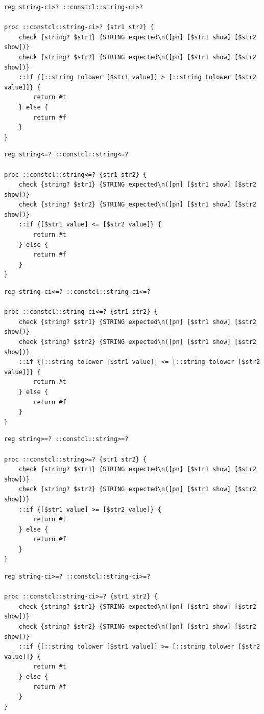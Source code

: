 \documentclass[twoside,9pt]{report}
\begin{document}
\noindent\makebox[\linewidth]{\rule{\linewidth}{0.4pt}}
\noindent\makebox[\linewidth]{\rule{\linewidth}{0.4pt}}
\begin{lstlisting}
reg string-ci>? ::constcl::string-ci>?
 
proc ::constcl::string-ci>? {str1 str2} {
    check {string? $str1} {STRING expected\n([pn] [$str1 show] [$str2 show])}
    check {string? $str2} {STRING expected\n([pn] [$str1 show] [$str2 show])}
    ::if {[::string tolower [$str1 value]] > [::string tolower [$str2 value]]} {
        return #t
    } else {
        return #f
    }
}
\end{lstlisting}
\noindent\makebox[\linewidth]{\rule{\linewidth}{0.4pt}}
\noindent\makebox[\linewidth]{\rule{\linewidth}{0.4pt}}
\begin{lstlisting}
reg string<=? ::constcl::string<=?
 
proc ::constcl::string<=? {str1 str2} {
    check {string? $str1} {STRING expected\n([pn] [$str1 show] [$str2 show])}
    check {string? $str2} {STRING expected\n([pn] [$str1 show] [$str2 show])}
    ::if {[$str1 value] <= [$str2 value]} {
        return #t
    } else {
        return #f
    }
}
\end{lstlisting}
\noindent\makebox[\linewidth]{\rule{\linewidth}{0.4pt}}
\noindent\makebox[\linewidth]{\rule{\linewidth}{0.4pt}}
\begin{lstlisting}
reg string-ci<=? ::constcl::string-ci<=?
 
proc ::constcl::string-ci<=? {str1 str2} {
    check {string? $str1} {STRING expected\n([pn] [$str1 show] [$str2 show])}
    check {string? $str2} {STRING expected\n([pn] [$str1 show] [$str2 show])}
    ::if {[::string tolower [$str1 value]] <= [::string tolower [$str2 value]]} {
        return #t
    } else {
        return #f
    }
}
\end{lstlisting}
\noindent\makebox[\linewidth]{\rule{\linewidth}{0.4pt}}
\noindent\makebox[\linewidth]{\rule{\linewidth}{0.4pt}}
\begin{lstlisting}
reg string>=? ::constcl::string>=?
 
proc ::constcl::string>=? {str1 str2} {
    check {string? $str1} {STRING expected\n([pn] [$str1 show] [$str2 show])}
    check {string? $str2} {STRING expected\n([pn] [$str1 show] [$str2 show])}
    ::if {[$str1 value] >= [$str2 value]} {
        return #t
    } else {
        return #f
    }
}
\end{lstlisting}
\noindent\makebox[\linewidth]{\rule{\linewidth}{0.4pt}}
\noindent\makebox[\linewidth]{\rule{\linewidth}{0.4pt}}
\begin{lstlisting}
reg string-ci>=? ::constcl::string-ci>=?
 
proc ::constcl::string-ci>=? {str1 str2} {
    check {string? $str1} {STRING expected\n([pn] [$str1 show] [$str2 show])}
    check {string? $str2} {STRING expected\n([pn] [$str1 show] [$str2 show])}
    ::if {[::string tolower [$str1 value]] >= [::string tolower [$str2 value]]} {
        return #t
    } else {
        return #f
    }
}
\end{lstlisting}
\noindent\makebox[\linewidth]{\rule{\linewidth}{0.4pt}}
\end{document}
